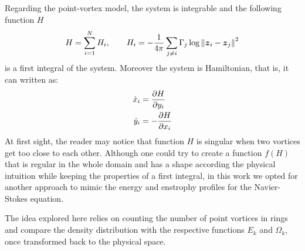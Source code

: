 \documentclass[../main.tex]{subfiles}
\begin{document}
Regarding the point-vortex model, the system is integrable and the following function $H$
\begin{equation}
	H = \sum_{i=1}^{N} H_i,\qquad H_i = -\frac{1}{4\pi} \sum_{j\neq i} \Gamma_j \log{\left\|\boldsymbol{z}_i-\boldsymbol{z}_j\right\|^2}
\end{equation}
is a first integral of the system. Moreover the system is Hamiltonian, that is, it can written as:
\begin{align}
	\dot{x}_i & = \pdv{H}{y_i}  \\
	\dot{y}_i & = -\pdv{H}{x_i}
\end{align}
At first sight, the reader may notice that function $H$ is singular when two vortices get too close to each other. Although one could try to create a function $f(H)$ that is regular in the whole domain and has a shape according the physical intuition while keeping the properties of a first integral, in this work we opted for another approach to mimic the energy and enstrophy profiles for the Navier-Stokes equation.

The idea explored here relies on counting the number of point vortices in rings and compare the density distribution with the respective functions $E_k$ and $\Omega_k$, once transformed back to the physical space.
\end{document}
